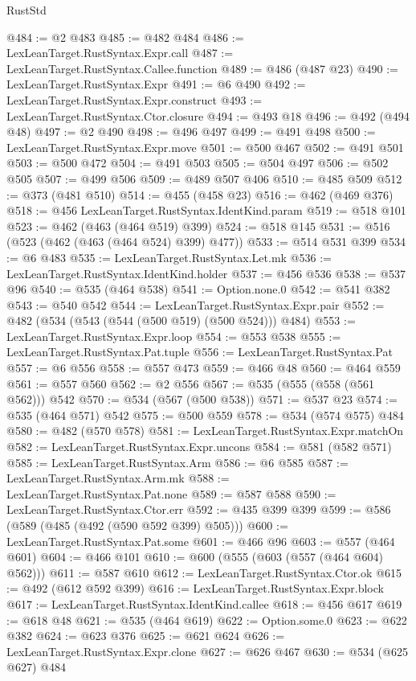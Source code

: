 \begin{lexlean}{RustStd}
\begin{coremodule}
@484 := @2 @483
@485 := @482 @484
@486 := LexLeanTarget.RustSyntax.Expr.call
@487 := LexLeanTarget.RustSyntax.Callee.function
@489 := @486 (@487 @23)
@490 := LexLeanTarget.RustSyntax.Expr
@491 := @6 @490
@492 := LexLeanTarget.RustSyntax.Expr.construct
@493 := LexLeanTarget.RustSyntax.Ctor.closure
@494 := @493 @18
@496 := @492 (@494 @48)
@497 := @2 @490
@498 := @496 @497
@499 := @491 @498
@500 := LexLeanTarget.RustSyntax.Expr.move
@501 := @500 @467
@502 := @491 @501
@503 := @500 @472
@504 := @491 @503
@505 := @504 @497
@506 := @502 @505
@507 := @499 @506
@509 := @489 @507 @406
@510 := @485 @509
@512 := @373 (@481 @510)
@514 := @455 (@458 @23)
@516 := @462 (@469 @376)
@518 := @456 LexLeanTarget.RustSyntax.IdentKind.param
@519 := @518 @101
@523 := @462 (@463 (@464 @519) @399)
@524 := @518 @145
@531 := @516 (@523 (@462 (@463 (@464 @524) @399) @477))
@533 := @514 @531 @399
@534 := @6 @483
@535 := LexLeanTarget.RustSyntax.Let.mk
@536 := LexLeanTarget.RustSyntax.IdentKind.holder
@537 := @456 @536
@538 := @537 @96
@540 := @535 (@464 @538)
@541 := Option.none.{0}
@542 := @541 @382
@543 := @540 @542
@544 := LexLeanTarget.RustSyntax.Expr.pair
@552 := @482 (@534 (@543 (@544 (@500 @519) (@500 @524))) @484)
@553 := LexLeanTarget.RustSyntax.Expr.loop
@554 := @553 @538
@555 := LexLeanTarget.RustSyntax.Pat.tuple
@556 := LexLeanTarget.RustSyntax.Pat
@557 := @6 @556
@558 := @557 @473
@559 := @466 @48
@560 := @464 @559
@561 := @557 @560
@562 := @2 @556
@567 := @535 (@555 (@558 (@561 @562))) @542
@570 := @534 (@567 (@500 @538))
@571 := @537 @23
@574 := @535 (@464 @571) @542
@575 := @500 @559
@578 := @534 (@574 @575) @484
@580 := @482 (@570 @578)
@581 := LexLeanTarget.RustSyntax.Expr.matchOn
@582 := LexLeanTarget.RustSyntax.Expr.uncons
@584 := @581 (@582 @571)
@585 := LexLeanTarget.RustSyntax.Arm
@586 := @6 @585
@587 := LexLeanTarget.RustSyntax.Arm.mk
@588 := LexLeanTarget.RustSyntax.Pat.none
@589 := @587 @588
@590 := LexLeanTarget.RustSyntax.Ctor.err
@592 := @435 @399 @399
@599 := @586 (@589 (@485 (@492 (@590 @592 @399) @505)))
@600 := LexLeanTarget.RustSyntax.Pat.some
@601 := @466 @96
@603 := @557 (@464 @601)
@604 := @466 @101
@610 := @600 (@555 (@603 (@557 (@464 @604) @562)))
@611 := @587 @610
@612 := LexLeanTarget.RustSyntax.Ctor.ok
@615 := @492 (@612 @592 @399)
@616 := LexLeanTarget.RustSyntax.Expr.block
@617 := LexLeanTarget.RustSyntax.IdentKind.callee
@618 := @456 @617
@619 := @618 @48
@621 := @535 (@464 @619)
@622 := Option.some.{0}
@623 := @622 @382
@624 := @623 @376
@625 := @621 @624
@626 := LexLeanTarget.RustSyntax.Expr.clone
@627 := @626 @467
@630 := @534 (@625 @627) @484

\end{coremodule}
\end{lexlean}
